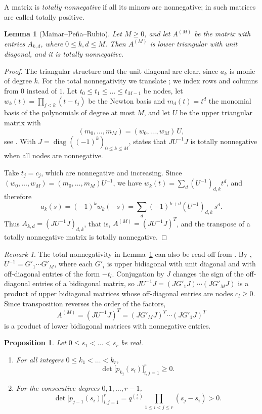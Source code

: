 \documentclass{amsart}
\newtheorem{proposition}[theorem]{Proposition}
\newtheorem{lemma}[theorem]{Lemma}
\theoremstyle{remark}
\newtheorem{remark}[theorem]{Remark}
\numberwithin{equation}{section}
\begin{document}
A matrix is \emph{totally nonnegative} if all its minors are nonnegative; in \cite{MPR} such matrices are called totally positive.

\begin{lemma}[Mainar--Pe\~na--Rubio]\label{lem:MPR}
Let $M\ge0$, and let $A^{(M)}$ be the matrix with entries $A_{k,d}$, where $0\le k,d\le M$. Then $A^{(M)}$ is lower triangular with unit diagonal, and it is totally nonnegative.
\end{lemma}

\begin{proof}
The triangular structure and the unit diagonal are clear, since $a_k$ is monic of degree $k$. For the total nonnegativity we translate \cite[Corollary~5]{MPR}; we index rows and columns from $0$ instead of $1$. Let $t_0\le t_1\le\dots\le t_{M-1}$ be nodes, let $w_k(t)=\prod_{j<k}(t-t_j)$ be the Newton basis and $m_d(t)=t^d$ the monomial basis of the polynomials of degree at most $M$, and let $U$ be the upper triangular matrix with
\[
(m_0,\dots,m_M)=(w_0,\dots,w_M)\,U,
\]
see \cite[(19)--(20)]{MPR}. With $J=\operatorname{diag}((-1)^k)_{0\le k\le M}$, \cite[Corollary~5]{MPR} states that $JU^{-1}J$ is totally nonnegative when all nodes are nonnegative.

Take $t_j=c_j$, which are nonnegative and increasing. Since $(w_0,\dots,w_M)=(m_0,\dots,m_M)U^{-1}$, we have $w_k(t)=\sum_d(U^{-1})_{d,k}t^d$, and therefore
\[
a_k(s)=(-1)^k w_k(-s)=\sum_{d}(-1)^{k+d}(U^{-1})_{d,k}\,s^d .
\]
Thus $A_{k,d}=(JU^{-1}J)_{d,k}$, that is, $A^{(M)}=(JU^{-1}J)^{T}$, and the transpose of a totally nonnegative matrix is totally nonnegative.
\end{proof}

\begin{remark}
The total nonnegativity in Lemma~\ref{lem:MPR} can also be read off from \cite[Theorem~3]{MPR}. By \cite[(24)--(25)]{MPR}, $U^{-1}=G'_1\cdots G'_M$, where each $G'_i$ is upper bidiagonal with unit diagonal and with off-diagonal entries of the form $-t_l$. Conjugation by $J$ changes the sign of the off-diagonal entries of a bidiagonal matrix, so $JU^{-1}J=(JG'_1J)\cdots(JG'_MJ)$ is a product of upper bidiagonal matrices whose off-diagonal entries are nodes $c_l\ge0$. Since transposition reverses the order of the factors,
\[
A^{(M)}=(JU^{-1}J)^{T}=(JG'_MJ)^{T}\cdots(JG'_1J)^{T}
\]
is a product of lower bidiagonal matrices with nonnegative entries.
\end{remark}

\begin{proposition}\label{prop:poly}
Let $0\le s_1<\dots<s_r$ be real.
\begin{enumerate}
\item[(a)] For all integers $0\le k_1<\dots<k_r$,
\[
\det\bigl[p_{k_j}(s_i)\bigr]_{i,j=1}^r\ge0 .
\]
\item[(b)] For the consecutive degrees $0,1,\dots,r-1$,
\[
\det\bigl[p_{j-1}(s_i)\bigr]_{i,j=1}^r=q^{\binom r3}\prod_{1\le i<j\le r}(s_j-s_i)>0 .
\]
\end{enumerate}
\end{proposition}
\end{document}
